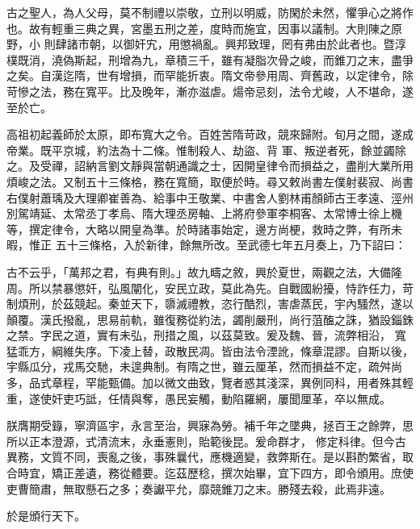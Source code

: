 
\begin{pinyinscope}

 古之聖人，為人父母，莫不制禮以崇敬，立刑以明威，防閑於未然，懼爭心之將作也。故有輕重三典之異，宮墨五刑之差，度時而施宜，因事以議制。大則陳之原野，小
 則肆諸市朝，以御奸宄，用懲禍亂。興邦致理，罔有弗由於此者也。暨淳樸既消，澆偽斯起，刑增為九，章積三千，雖有凝脂次骨之峻，而錐刀之末，盡爭之矣。自漢迄隋，世有增損，而罕能折衷。隋文帝參用周、齊舊政，以定律令，除苛慘之法，務在寬平。比及晚年，漸亦滋虐。煬帝忌刻，法令尤峻，人不堪命，遂至於亡。



 高祖初起義師於太原，即布寬大之令。百姓苦隋苛政，競來歸附。旬月之間，遂成帝業。既平京城，約法為十二條。惟制殺人、劫盜、背
 軍、叛逆者死，餘並蠲除之。及受禪，詔納言劉文靜與當朝通識之士，因開皇律令而損益之，盡削大業所用煩峻之法。又制五十三條格，務在寬簡，取便於時。尋又敕尚書左僕射裴寂、尚書右僕射蕭瑀及大理卿崔善為、給事中王敬業、中書舍人劉林甫顏師古王孝遠、涇州別駕靖延、太常丞丁孝烏、隋大理丞房軸、上將府參軍李桐客、太常博士徐上機等，撰定律令，大略以開皇為準。於時諸事始定，邊方尚梗，救時之弊，有所未暇，惟正
 五十三條格，入於新律，餘無所改。至武德七年五月奏上，乃下詔曰：



 古不云乎，「萬邦之君，有典有則。」故九疇之敘，興於夏世，兩觀之法，大備隆周。所以禁暴懲奸，弘風闡化，安民立政，莫此為先。自戰國紛擾，恃詐任力，苛制煩刑，於茲競起。秦並天下，隳滅禮教，恣行酷烈，害虐蒸民，宇內騷然，遂以顛覆。漢氏撥亂，思易前軌，雖復務從約法，蠲削嚴刑，尚行菹醢之誅，猶設錙銖之禁。字民之道，實有未弘，刑措之風，以茲莫致。爰及魏、晉，流弊相沿，
 寬猛乖方，綱維失序。下凌上替，政散民凋。皆由法令湮訛，條章混謬。自斯以後，宇縣瓜分，戎馬交馳，未遑典制。有隋之世，雖云厘革，然而損益不定，疏舛尚多，品式章程，罕能甄備。加以微文曲致，覽者惑其淺深，異例同科，用者殊其輕重，遂使奸吏巧詆，任情與奪，愚民妄觸，動陷羅網，屢聞厘革，卒以無成。



 朕膺期受籙，寧濟區宇，永言至治，興寐為勞。補千年之墜典，拯百王之餘弊，思所以正本澄源，式清流末，永垂憲則，貽範後昆。爰命群才，
 修定科律。但今古異務，文質不同，喪亂之後，事殊曩代，應機適變，救弊斯在。是以斟酌繁省，取合時宜，矯正差遺，務從體要。迄茲歷稔，撰次始畢，宜下四方，即令頒用。庶使吏曹簡肅，無取懸石之多；奏讞平允，靡競錐刀之末。勝殘去殺，此焉非遠。



 於是頒行天下。




\end{pinyinscope}
